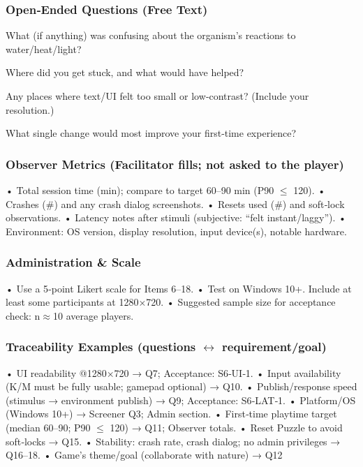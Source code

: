 \documentclass[12pt, titlepage]{article}
\begin{document}
\subsubsection{Open‑Ended Questions (Free Text)}

What (if anything) was confusing about the organism’s reactions to water/heat/light?

Where did you get stuck, and what would have helped?

Any places where text/UI felt too small or low‑contrast? (Include your resolution.)

What single change would most improve your first‑time experience?

\subsubsection{Observer Metrics (Facilitator fills; not asked to the player)}

• Total session time (min); compare to target 60–90 min (P90 $\leq$ 120).
 • Crashes (\#) and any crash dialog screenshots.
 • Resets used (\#) and soft‑lock observations.
 • Latency notes after stimuli (subjective: “felt instant/laggy”).
 • Environment: OS version, display resolution, input device(s), notable hardware.

\subsubsection{Administration \& Scale}

• Use a 5‑point Likert scale for Items 6–18.
 • Test on Windows 10+. Include at least some participants at 1280×720.
 • Suggested sample size for acceptance check: n$\approx$10 average players.

\subsubsection{Traceability Examples (questions $\leftrightarrow$ requirement/goal)}

• UI readability @1280×720 → Q7; Acceptance: S6‑UI‑1.
 • Input availability (K/M must be fully usable; gamepad optional) → Q10.
 • Publish/response speed (stimulus → environment publish) → Q9; Acceptance: S6‑LAT‑1.
 • Platform/OS (Windows 10+) → Screener Q3; Admin section.
 • First‑time playtime target (median 60–90; P90 $\leq$ 120) → Q11; Observer totals.
 • Reset Puzzle to avoid soft‑locks → Q15.
 • Stability: crash rate, crash dialog; no admin privileges → Q16–18.
 • Game’s theme/goal (collaborate with nature) → Q12
\end{document}
